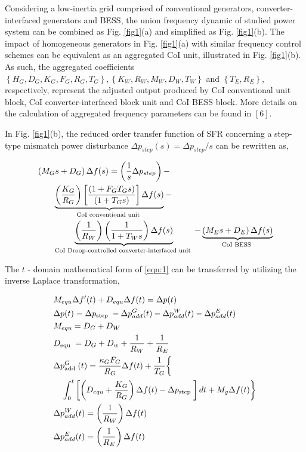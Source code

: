 \documentclass[lettersize,journal]{IEEEtran}
\begin{document}
Considering a low-inertia grid comprised of conventional generators, converter-interfaced generators and BESS, the union frequency dynamic of studied power system can be combined as Fig. \ref{fig1}(a) and simplified as Fig. \ref{fig1}(b). The impact of homogeneous generators in Fig. \ref{fig1}(a) with similar frequency control schemes can be equivalent as an aggregated $\mathrm{CoI}$ unit, illustrated in Fig. \ref{fig1}(b). As such, the aggregated coefficients $\left\{H_{G}, D_{G}, K_{G}, F_{G}, R_{G}, T_{G}\right\},\left\{K_{W}, R_{W}, M_{W}, D_{W}, T_{W}\right\}$ and $\left\{T_{E}, R_{E}\right\}$, respectively, represent the adjusted output produced by $\mathrm{CoI}$ conventional unit block, $\mathrm{CoI}$ converter-interfaced block unit and CoI BESS block. More details on the calculation of aggregated frequency parameters can be found in $[6]$.

In Fig. \ref{fig1}(b), the reduced order transfer function of SFR concerning a step-type mismatch power disturbance $\Delta p_{{step }}(s)=\Delta p_{{step }} / s$ can be rewritten as,

\begin{align}\label{eqn:1}
& \left(M_{G} s+D_{G}\right) \Delta f(s)=\left(\frac{1}{s} \Delta p_{ {step }}\right)- \\
& \qquad\underbrace{\left(\frac{K_{G}}{ R_{G}}\right)\left[\frac{\left(1+F_{G} T_{G} s\right)}{\left(1+T_{G} s\right)}\right] \Delta f(s)}_{\text {CoI conventional unit }}- \notag\\
& \qquad\underbrace{\left(\frac{1}{R_{W}}\right)\left(\frac{1}{1+T_{W} s}\right) \Delta f(s)}_{\text {CoI Droop-controlled converter-interfaced unit }}-\underbrace{\left(M_{E} s+D_{E}\right) \Delta f(s)}_{\text {CoI BESS }} \notag
\end{align}

The $t$ - domain mathematical form of \eqref{eqn:1} can be transferred by utilizing the inverse Laplace transformation,

\begin{subequations}\label{eqn:2}
\begin{align}
& M_{e q u} \Delta f^{\prime}(t)+D_{e q u} \Delta f(t)=\Delta p(t) \\
& \Delta p(t)=\Delta p_{\text {step }}-\Delta p_{a d d}^{G}(t)-\Delta p_{a d d}^{W}(t)-\Delta p_{a d d}^{E}(t) \\
& M_{e q u}=D_{G}+D_{W} \\
& D_{\text {equ }}=D_{G}+D_{w}+\frac{1}{ R_{W}} +\frac{1}{ R_{E}} \\
& \Delta p_{\text {add }}^{G}(t)=\frac{\kappa_{G} F_{G}}{ R_{G}} \Delta f(t)+\frac{1}{ T_{G} }\biggl\{ \\
& \quad \int_{0}^{t}\left[\left(D_{e q u}+\frac{K_{G}}{ R_{G}}\right) \Delta f(t)-\Delta p_{\text {step }}\right] d t+M_{g} \Delta f(t)\biggr\} \notag\\
& \Delta p_{a d d}^{W}(t)=\left(\frac{1}{R_{W}}\right) \Delta f(t)\\
& \Delta p_{a d d}^{E}(t)=\left(\frac{1}{ R_{E}}\right) \Delta f(t)
\end{align}
\end{subequations}
\end{document}

